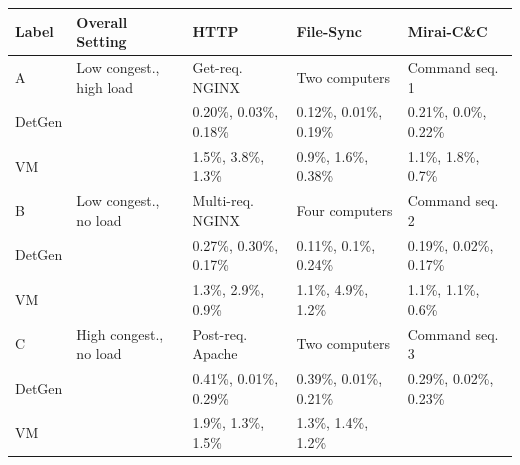 \documentclass[sigconf]{acmart}
\begin{document}
\begin{table}
\centering
\begin{tabular}{p{1cm}|p{3.2cm}|p{2.7cm}|p{2.7cm}|p{2.7cm}}
Label &Overall Setting&HTTP&File-Sync & Mirai-C\&C\\ \hline
A&Low congest., high load& Get-req. NGINX&  Two computers & Command seq. 1 \\ \hline
DetGen &&\footnotesize \textcolor{myred}{0.20\%}, \textcolor{mygreen}{0.03\%}, \textcolor{myblue}{0.18\%}&
 \footnotesize \textcolor{myred}{0.12\%}, \textcolor{mygreen}{0.01\%}, \textcolor{myblue}{0.19\%}&
 \footnotesize \textcolor{myred}{0.21\%}, \textcolor{mygreen}{0.0\%}, \textcolor{myblue}{0.22\%}\\ \hline \hline
VM & &\footnotesize \textcolor{myred}{1.5\%}, \textcolor{mygreen}{3.8\%}, \textcolor{myblue}{1.3\%}&
 \footnotesize \textcolor{myred}{0.9\%}, \textcolor{mygreen}{1.6\%}, \textcolor{myblue}{0.38\%}&
 \footnotesize \textcolor{myred}{1.1\%}, \textcolor{mygreen}{1.8\%}, \textcolor{myblue}{0.7\%}\\ \hline \hline
B& Low congest., no load &Multi-req. NGINX & Four computers & Command seq. 2\\ \hline
DetGen &&\footnotesize \textcolor{myred}{0.27\%}, \textcolor{mygreen}{0.30\%}, \textcolor{myblue}{0.17\%}&
\footnotesize \textcolor{myred}{0.11\%}, \textcolor{mygreen}{0.1\%}, \textcolor{myblue}{0.24\%}&
\footnotesize \textcolor{myred}{0.19\%}, \textcolor{mygreen}{0.02\%}, \textcolor{myblue}{0.17\%}\\ \hline \hline
VM & &\footnotesize \textcolor{myred}{1.3\%}, \textcolor{mygreen}{2.9\%}, \textcolor{myblue}{0.9\%}&
 \footnotesize \textcolor{myred}{1.1\%}, \textcolor{mygreen}{4.9\%}, \textcolor{myblue}{1.2\%}&
 \footnotesize \textcolor{myred}{1.1\%}, \textcolor{mygreen}{1.1\%}, \textcolor{myblue}{0.6\%}\\ \hline \hline
C& High congest., no load & Post-req. Apache &Two computers & Command seq. 3\\ \hline
DetGen &&\footnotesize \textcolor{myred}{0.41\%}, \textcolor{mygreen}{0.01\%}, \textcolor{myblue}{0.29\%}&
 \footnotesize \textcolor{myred}{0.39\%}, \textcolor{mygreen}{0.01\%}, \textcolor{myblue}{0.21\%}&
 \footnotesize \textcolor{myred}{0.29\%}, \textcolor{mygreen}{0.02\%}, \textcolor{myblue}{0.23\%}\\ \hline \hline
VM & &\footnotesize \textcolor{myred}{1.9\%}, \textcolor{mygreen}{1.3\%}, \textcolor{myblue}{1.5\%}&
 \footnotesize \textcolor{myred}{1.3\%}, \textcolor{mygreen}{1.4\%}, \textcolor{myblue}{1.2\%}&

\end{tabular}
\end{table}
\end{document}
